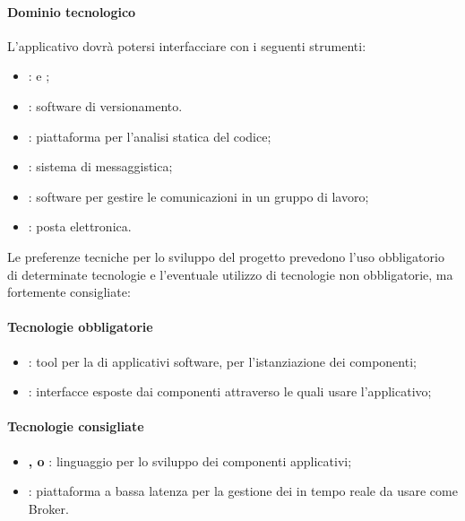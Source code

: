 	\paragraph{Dominio tecnologico} \Spazio
	L'applicativo dovrà potersi interfacciare con i seguenti strumenti:
	\begin{itemize}
		\item  \textbf{}:  e ;
		\item  \textbf{}: software di versionamento.
		\item  \textbf{}: piattaforma per l'analisi statica del codice;
		\item  \textbf{}: sistema di messaggistica;
		\item  \textbf{}: software per gestire le comunicazioni in un gruppo di lavoro;
		\item  \textbf{}: posta elettronica.
		
	\end{itemize}
	
	Le preferenze tecniche per lo sviluppo del progetto prevedono l'uso obbligatorio di determinate tecnologie e l'eventuale utilizzo di tecnologie non obbligatorie, ma fortemente consigliate:
	\paragraph{Tecnologie obbligatorie}
	\begin{itemize}
		\item  \textbf{}: tool per la  di applicativi software, per l'istanziazione dei componenti;
		\item  \textbf{}: interfacce esposte dai componenti attraverso le quali usare l'applicativo;
	\end{itemize}
	\paragraph{Tecnologie consigliate}
	\begin{itemize}
		\item \textbf{, o }: linguaggio per lo sviluppo dei componenti applicativi;  
		\item  \textbf{}: piattaforma a bassa latenza per la gestione dei  in tempo reale da usare come Broker.
	\end{itemize}
	
